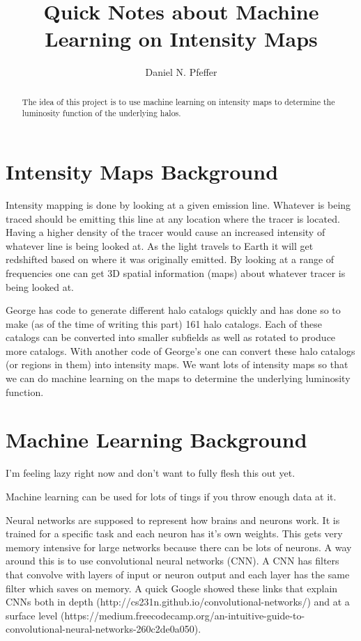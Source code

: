 \documentclass{article}
\title{Quick Notes about Machine Learning on Intensity Maps}
\author{Daniel N. Pfeffer}
\date{}
\begin{document}
% 

	\maketitle

	\begin{abstract}
		The idea of this project is to use machine learning on intensity maps to determine the luminosity function of the underlying halos.
	\end{abstract}

	\section{Intensity Maps Background} \label{sec:IMback}

		Intensity mapping is done by looking at a given emission line.  Whatever is being traced should be emitting this line at any location where the tracer is located.  Having a higher density of the tracer would cause an increased intensity of whatever line is being looked at.  As the light travels to Earth it will get redshifted based on where it was originally emitted.  By looking at a range of frequencies one can get 3D spatial information (maps) about whatever tracer is being looked at.  

		George has code to generate different halo catalogs quickly and has done so to make (as of the time of writing this part) 161 halo catalogs.  Each of these catalogs can be converted into smaller subfields as well as rotated to produce more catalogs.  With another code of George's one can convert these halo catalogs (or regions in them) into intensity maps.  We want lots of intensity maps so that we can do machine learning on the maps to determine the underlying luminosity function.

	\section{Machine Learning Background} \label{sec:MLback}

		I'm feeling lazy right now and don't want to fully flesh this out yet.

		Machine learning can be used for lots of tings if you throw enough data at it.  

		Neural networks are supposed to represent how brains and neurons work.  It is trained for a specific task and each neuron has it's own weights.  This gets very memory intensive for large networks because there can be lots of neurons.  A way around this is to use convolutional neural networks (CNN).  A CNN has filters that convolve with layers of input or neuron output and each layer has the same filter which saves on memory.  A quick Google showed these links that explain CNNs both in depth (http://cs231n.github.io/convolutional-networks/) and at a surface level (https://medium.freecodecamp.org/an-intuitive-guide-to-convolutional-neural-networks-260c2de0a050).
\end{document}
